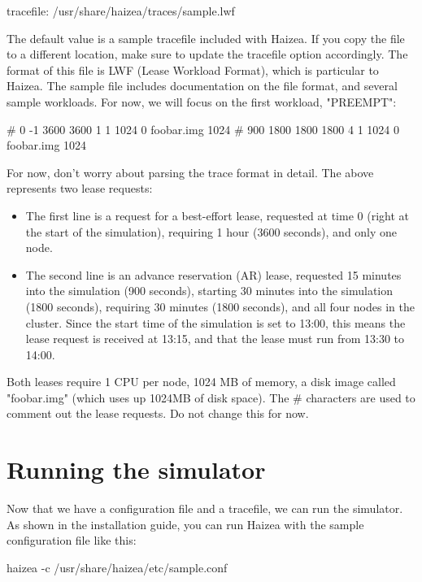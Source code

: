 \begin{wideshellverbatim}
[tracefile]
tracefile: /usr/share/haizea/traces/sample.lwf 
\end{wideshellverbatim}

The default value is a sample tracefile included with Haizea. If you copy the file to a different location, make sure to update the tracefile option accordingly. The format of this file is LWF (Lease Workload Format), which is particular to Haizea. The sample file includes documentation on the file format, and several sample workloads. For now, we will focus on the first workload, "PREEMPT":

\begin{wideshellverbatim}
# 0   -1   3600 3600 1 1 1024 0 foobar.img 1024
# 900 1800 1800 1800 4 1 1024 0 foobar.img 1024
\end{wideshellverbatim}

For now, don't worry about parsing the trace format in detail. The above represents two lease requests:

\begin{itemize}
\item The first line is a request for a best-effort lease, requested at time 0 (right at the start of the simulation), requiring 1 hour (3600 seconds), and only one node.
\item The second line is an advance reservation (AR) lease, requested 15 minutes into the simulation (900 seconds), starting 30 minutes into the simulation (1800 seconds), requiring 30 minutes (1800 seconds), and all four nodes in the cluster. Since the start time of the simulation is set to 13:00, this means the lease request is received at 13:15, and that the lease must run from 13:30 to 14:00.
\end{itemize}

Both leases require 1 CPU per node, 1024 MB of memory, a disk image called "foobar.img" (which uses up 1024MB of disk space). The \# characters are used to comment out the lease requests. Do not change this for now.

\section{Running the simulator}

Now that we have a configuration file and a tracefile, we can run the simulator. As shown in the installation guide, you can run Haizea with the sample configuration file like this:

\begin{shellverbatim}
haizea -c /usr/share/haizea/etc/sample.conf 
\end{shellverbatim}

